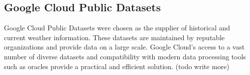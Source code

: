 \subsection{Google Cloud Public Datasets}
Google Cloud Public Datasets were chosen as the supplier of historical and current weather information. These datasets are maintained by reputable organizations and provide data on a large scale. Google Cloud's access to a vast number of diverse datasets and compatibility with modern data processing tools such as oracles provide a practical and efficient solution. (todo write more)